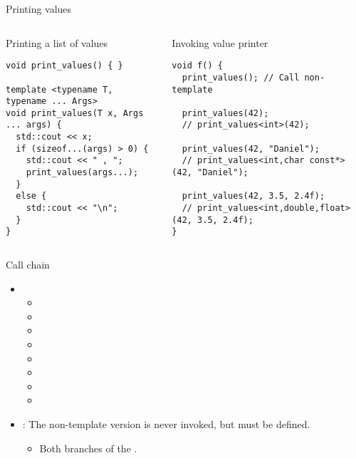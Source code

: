 \begin{frame}[t,fragile]{Printing values}

\begin{columns}[T]

\begin{block}{Printing a list of values}
\begin{lstlisting}
void print_values() { }

template <typename T, typename ... Args>
void print_values(T x, Args ... args) {
  std::cout << x;
  if (sizeof...(args) > 0) {
    std::cout << " , ";
    print_values(args...);
  }
  else {
    std::cout << "\n";
  }
}
\end{lstlisting}
\end{block}

\begin{block}{Invoking value printer}
\begin{lstlisting}
void f() {
  print_values(); // Call non-template

  print_values(42);
  // print_values<int>(42);

  print_values(42, "Daniel");
  // print_values<int,char const*>(42, "Daniel");

  print_values(42, 3.5, 2.4f);
  // print_values<int,double,float>(42, 3.5, 2.4f);
}
\end{lstlisting}
\end{block}

\end{columns}
\end{frame}

\begin{frame}[t,fragile]{Call chain}
\begin{itemize}
  \item {}
    \begin{itemize}
      \item \pause {}
      \item \pause {}
      \item \pause {}
      \item \pause {}
      \item \pause {}
      \item \pause {}
      \item \pause {}
      \item \pause {}
    \end{itemize}

  \item {}: The non-template version is never invoked,
        but must be defined.
    \begin{itemize}
      \item Both branches of the  .
    \end{itemize}
\end{itemize}
\end{frame}
